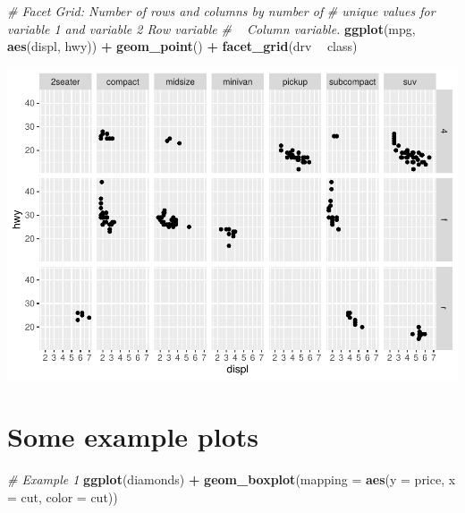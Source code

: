 \documentclass[
]{book}
\newenvironment{Shaded}{\begin{snugshade}}{\end{snugshade}}
\newcommand{\CommentTok}[1]{\textcolor[rgb]{0.56,0.35,0.01}{\textit{#1}}}
\newcommand{\DataTypeTok}[1]{\textcolor[rgb]{0.13,0.29,0.53}{#1}}
\newcommand{\KeywordTok}[1]{\textcolor[rgb]{0.13,0.29,0.53}{\textbf{#1}}}
\newcommand{\NormalTok}[1]{#1}
\newcommand{\OperatorTok}[1]{\textcolor[rgb]{0.81,0.36,0.00}{\textbf{#1}}}
\newcommand{\StringTok}[1]{\textcolor[rgb]{0.31,0.60,0.02}{#1}}
\begin{document}
\begin{Shaded}
\begin{Highlighting}[]
\CommentTok{# Facet Grid: Number of rows and columns by number of}
\CommentTok{# unique values for variable 1 and variable 2 Row variable}
\CommentTok{# ~ Column variable.}
\KeywordTok{ggplot}\NormalTok{(mpg, }\KeywordTok{aes}\NormalTok{(displ, hwy)) }\OperatorTok{+}\StringTok{ }\KeywordTok{geom_point}\NormalTok{() }\OperatorTok{+}\StringTok{ }\KeywordTok{facet_grid}\NormalTok{(drv }\OperatorTok{~}
\StringTok{    }\NormalTok{class)}
\end{Highlighting}
\end{Shaded}

\includegraphics{_main_files/figure-latex/unnamed-chunk-257-2.pdf}

\hypertarget{some-example-plots}{%
\section{Some example plots}\label{some-example-plots}}

\begin{Shaded}
\begin{Highlighting}[]
\CommentTok{# Example 1}
\KeywordTok{ggplot}\NormalTok{(diamonds) }\OperatorTok{+}\StringTok{ }\KeywordTok{geom_boxplot}\NormalTok{(}\DataTypeTok{mapping =} \KeywordTok{aes}\NormalTok{(}\DataTypeTok{y =}\NormalTok{ price, }\DataTypeTok{x =}\NormalTok{ cut,}
    \DataTypeTok{color =}\NormalTok{ cut))}
\end{Highlighting}
\end{Shaded}
\end{document}
